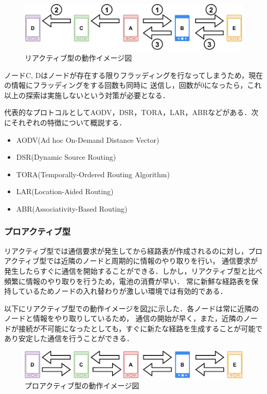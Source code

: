 \documentclass[a4paper, 11pt]{ltjsarticle}
\begin{document}
\begin{figure}[H]
  \centering
  \includegraphics[width=130mm]{reactive_model.pdf}
  \caption{リアクティブ型の動作イメージ図}
  \label{reactive}
\end{figure}

ノードC, Dはノードが存在する限りフラッディングを行なってしまうため，現在の情報にフラッディングをする回数も同時に
送信し，回数が0になったら，これ以上の探索は実施しないという対策が必要となる．

代表的なプロトコルとしてAODV，DSR，TORA，LAR，ABRなどがある．次にそれぞれの特徴について概説する．

\begin{itemize}
  \item AODV(Ad hoc On-Demand Distance Vector)\cite{AODV} \\
  \item DSR(Dynamic Source Routing)\cite{DSR} \\
  \item TORA(Temporally-Ordered Routing Algorithm)\cite{TORA} \\
  \item LAR(Location-Aided Routing)\cite{LAR} \\
  \item ABR(Associativity-Based Routing)\cite{ABR} \\
\end{itemize}

\clearpage
\subsubsection{プロアクティブ型}
リアクティブ型では通信要求が発生してから経路表が作成されるのに対し，プロアクティブ型では近隣のノードと周期的に情報のやり取りを行い，
通信要求が発生したらすぐに通信を開始することができる．しかし，リアクティブ型と比べ頻繁に情報のやり取りを行うため，電池の消費が早い．
常に新鮮な経路表を保持しているためノードの入れ替わりが激しい環境では有効的である．

以下にリアクティブ型での動作イメージを図\ref{proactive}に示した．各ノードは常に近隣のノードと情報をやり取りしているため，
通信の開始が早く，また，近隣のノードが接続が不可能になったとしても，すぐに新たな経路を生成することが可能であり安定した通信を行うことができる．
\begin{figure}[H]
  \centering
  \includegraphics[width=130mm]{proactive_model.pdf}
  \caption{プロアクティブ型の動作イメージ図}
  \label{proactive}
\end{figure}
\end{document}
